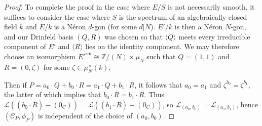 \documentclass[11pt]{amsart}
\theoremstyle{definition}
\begin{document}
\begin{proof}
To complete the proof in the case where $E/S$ is not necessarily smooth, it suffices to consider the case where $S$ is the spectrum of an algebraically closed field $k$ and $E/k$ is a N\'eron $d$-gon (for some $d|N$). $E'/k$ is then a N\'eron $N$-gon, and our Drinfeld basis $(Q,R)$ was chosen so that $\langle Q \rangle$ meets every irreducible component of $E'$ and $\langle R \rangle$ lies on the identity component. We may therefore choose an isomorphism $E'^{\mathrm{sm}} \cong \mathbb{Z}/(N) \times \mu_N$ such that $Q = (1,1)$ and $R = (0,\zeta)$ for some $\zeta \in \mu_N^\times (k)$. 
\begin{center}
\end{center}
Then if $P = a_0 \cdot Q + b_0 \cdot R = a_1 \cdot Q + b_1 \cdot R$, it follows that $a_0 = a_1$ and $\zeta^{b_0} = \zeta^{b_1}$, the latter of which implies that $b_0 \cdot \overline{R} = b_1 \cdot \overline{R}$. Thus ${\mathcal{L}}((b_0 \cdot \overline{R}) - (0_C)) = {\mathcal{L}}((b_1 \cdot \overline{R}) - (0_C))$, so ${\mathcal{L}}_{(a_0,b_0)} = {\mathcal{L}}_{(a_1,b_1)}$, hence $({\mathcal{C}}_P,\phi_P)$ is independent of the choice of $(a_0,b_0)$.


\end{proof}
\end{document}
